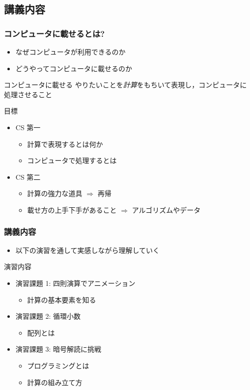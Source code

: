 \subsection{講義内容}
\begin{frame}
\frametitle{コンピュータに載せるとは?}
  \begin{itemize}
\item なぜコンピュータが利用できるのか
\item どうやってコンピュータに載せるのか
  \end{itemize}
  \begin{block}{コンピュータに載せる}
やりたいことを\emph{計算}をもちいて表現し，コンピュータに処理させること
  \end{block}
  \begin{block}{目標}
    \begin{itemize}
\item CS 第一
      \begin{itemize}
\item 計算で表現するとは何か
\item コンピュータで処理するとは
      \end{itemize}
\item CS 第二 \href{http://www.is.c.titech.ac.jp/~is0000_kashima/CSpublic/3Q.html}{}
      \begin{itemize}
\item 計算の強力な道具 $\Rightarrow$ 再帰
\item 載せ方の上手下手があること $\Rightarrow$ アルゴリズムやデータ
      \end{itemize}
    \end{itemize}
  \end{block}
\end{frame}
\begin{frame}
\frametitle{講義内容}
  \begin{itemize}
\item 以下の演習を通して実感しながら理解していく
  \end{itemize}
  \begin{block}{演習内容}
    \begin{itemize}
\item 演習課題 1: 四則演算でアニメーション
      \begin{itemize}
\item 計算の基本要素を知る
      \end{itemize}
\item 演習課題 2: 循環小数
      \begin{itemize}
\item 配列とは
      \end{itemize}
\item 演習課題 3: 暗号解読に挑戦
      \begin{itemize}
\item プログラミングとは
\item 計算の組み立て方
      \end{itemize}
    \end{itemize}
  \end{block}
\end{frame}
